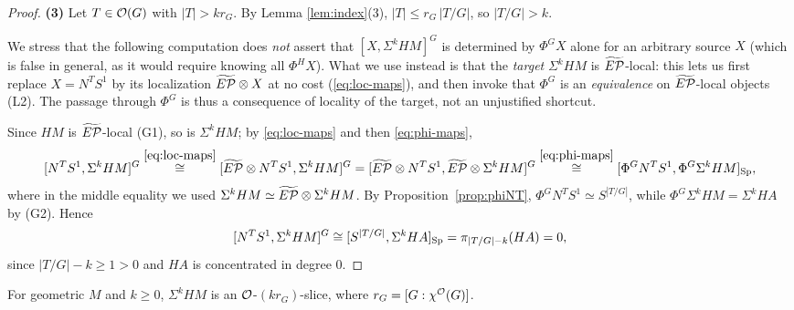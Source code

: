 \begin{proof}
\textbf{(3)} Let $T\in\mathcal{O}(G)$ with $|T|>k r_G$. By Lemma \ref{lem:index}(3),
$|T|\le r_G\,|T/G|$, so $|T/G|>k$.

We stress that the following computation does \emph{not} assert that
$[X,\Sigma^kHM]^G$ is determined by $\Phi^GX$ alone for an arbitrary source $X$
(which is false in general, as it would require knowing all $\Phi^HX$). What we
use instead is that the \emph{target} $\Sigma^k HM$ is $\widetilde{E\mathcal P}$-local: this lets
us first replace $X=N^TS^1$ by its localization $\widetilde{E\mathcal P}\otimes X$ at no cost
(\eqref{eq:loc-maps}), and then invoke that $\Phi^G$ is an \emph{equivalence}
on $\widetilde{E\mathcal P}$-local objects (L2). The passage through $\Phi^G$ is thus a
consequence of locality of the target, not an unjustified shortcut.

Since $HM$ is $\widetilde{E\mathcal P}$-local (G1), so is
$\Sigma^k HM$; by \eqref{eq:loc-maps} and then \eqref{eq:phi-maps},
\[
[N^T S^1,\Sigma^k HM]^G
\overset{\eqref{eq:loc-maps}}{\cong}[\widetilde{E\mathcal P}\otimes N^T S^1,\Sigma^k HM]^G
=[\widetilde{E\mathcal P}\otimes N^T S^1,\widetilde{E\mathcal P}\otimes\Sigma^k HM]^G
\overset{\eqref{eq:phi-maps}}{\cong}[\Phi^G N^T S^1,\Phi^G\Sigma^k HM]_{\mathrm{Sp}},
\]
where in the middle equality we used $\Sigma^k HM\simeq\widetilde{E\mathcal P}\otimes\Sigma^k HM$. By Proposition~\ref{prop:phiNT}, $\Phi^G N^T S^1\simeq S^{|T/G|}$, while
$\Phi^G\Sigma^k HM=\Sigma^k HA$ by (G2). Hence
\[
[N^T S^1,\Sigma^k HM]^G\cong[S^{|T/G|},\Sigma^k HA]_{\mathrm{Sp}}
=\pi_{|T/G|-k}(HA)=0 ,
\]
since $|T/G|-k\ge 1>0$ and $HA$ is concentrated in degree $0$.
\end{proof}

\begin{qfivecorollary}\label{cor:exact-slice}
For geometric $M$ and $k\ge0$, $\Sigma^k HM$ is an $\mathcal{O}$-$(k r_G)$-slice, where
$r_G=[G:\chi^{\mathcal{O}}(G)]$.
\end{qfivecorollary}


